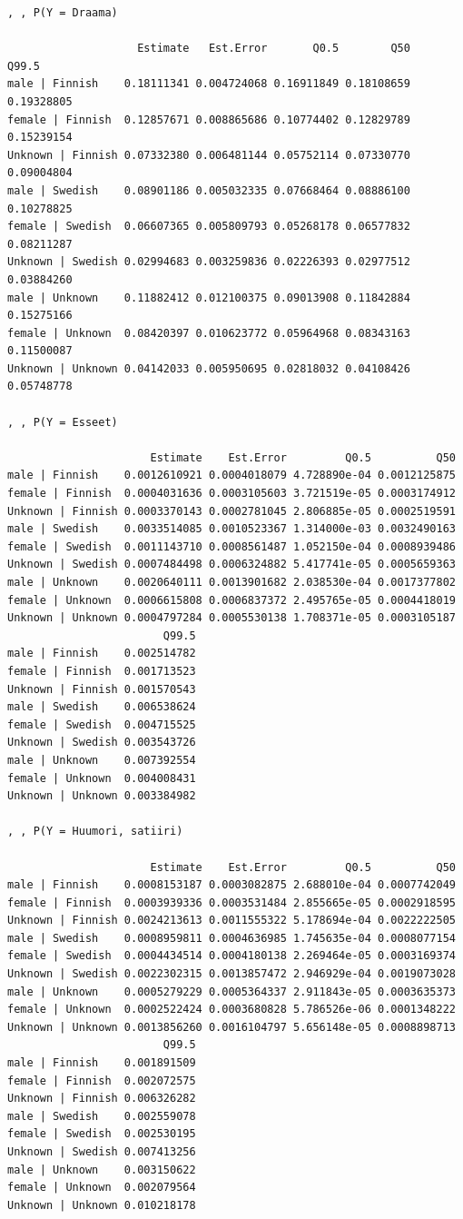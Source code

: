 \documentclass[
  letterpaper,
  DIV=11,
  numbers=noendperiod]{scrartcl}
\begin{document}
\begin{verbatim}
, , P(Y = Draama)

                    Estimate   Est.Error       Q0.5        Q50      Q99.5
male | Finnish    0.18111341 0.004724068 0.16911849 0.18108659 0.19328805
female | Finnish  0.12857671 0.008865686 0.10774402 0.12829789 0.15239154
Unknown | Finnish 0.07332380 0.006481144 0.05752114 0.07330770 0.09004804
male | Swedish    0.08901186 0.005032335 0.07668464 0.08886100 0.10278825
female | Swedish  0.06607365 0.005809793 0.05268178 0.06577832 0.08211287
Unknown | Swedish 0.02994683 0.003259836 0.02226393 0.02977512 0.03884260
male | Unknown    0.11882412 0.012100375 0.09013908 0.11842884 0.15275166
female | Unknown  0.08420397 0.010623772 0.05964968 0.08343163 0.11500087
Unknown | Unknown 0.04142033 0.005950695 0.02818032 0.04108426 0.05748778

, , P(Y = Esseet)

                      Estimate    Est.Error         Q0.5          Q50
male | Finnish    0.0012610921 0.0004018079 4.728890e-04 0.0012125875
female | Finnish  0.0004031636 0.0003105603 3.721519e-05 0.0003174912
Unknown | Finnish 0.0003370143 0.0002781045 2.806885e-05 0.0002519591
male | Swedish    0.0033514085 0.0010523367 1.314000e-03 0.0032490163
female | Swedish  0.0011143710 0.0008561487 1.052150e-04 0.0008939486
Unknown | Swedish 0.0007484498 0.0006324882 5.417741e-05 0.0005659363
male | Unknown    0.0020640111 0.0013901682 2.038530e-04 0.0017377802
female | Unknown  0.0006615808 0.0006837372 2.495765e-05 0.0004418019
Unknown | Unknown 0.0004797284 0.0005530138 1.708371e-05 0.0003105187
                        Q99.5
male | Finnish    0.002514782
female | Finnish  0.001713523
Unknown | Finnish 0.001570543
male | Swedish    0.006538624
female | Swedish  0.004715525
Unknown | Swedish 0.003543726
male | Unknown    0.007392554
female | Unknown  0.004008431
Unknown | Unknown 0.003384982

, , P(Y = Huumori, satiiri)

                      Estimate    Est.Error         Q0.5          Q50
male | Finnish    0.0008153187 0.0003082875 2.688010e-04 0.0007742049
female | Finnish  0.0003939336 0.0003531484 2.855665e-05 0.0002918595
Unknown | Finnish 0.0024213613 0.0011555322 5.178694e-04 0.0022222505
male | Swedish    0.0008959811 0.0004636985 1.745635e-04 0.0008077154
female | Swedish  0.0004434514 0.0004180138 2.269464e-05 0.0003169374
Unknown | Swedish 0.0022302315 0.0013857472 2.946929e-04 0.0019073028
male | Unknown    0.0005279229 0.0005364337 2.911843e-05 0.0003635373
female | Unknown  0.0002522424 0.0003680828 5.786526e-06 0.0001348222
Unknown | Unknown 0.0013856260 0.0016104797 5.656148e-05 0.0008898713
                        Q99.5
male | Finnish    0.001891509
female | Finnish  0.002072575
Unknown | Finnish 0.006326282
male | Swedish    0.002559078
female | Swedish  0.002530195
Unknown | Swedish 0.007413256
male | Unknown    0.003150622
female | Unknown  0.002079564
Unknown | Unknown 0.010218178


\end{verbatim}
\end{document}
